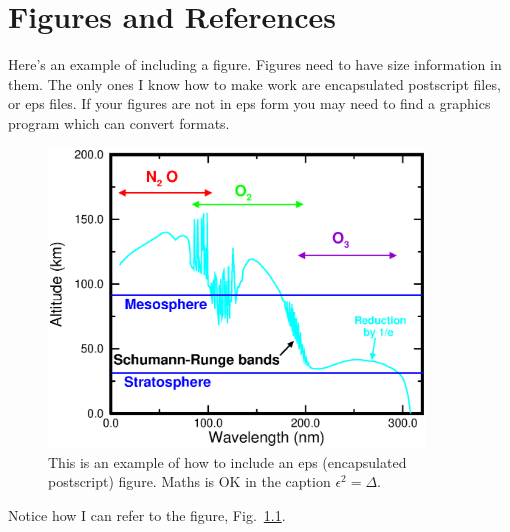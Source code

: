 \setcounter{page}{1}  %

\chapter{Figures and References}



Here's an example of including a figure. Figures need to have size information in them. The only ones I know how to make work are encapsulated postscript files, or eps files. If your figures are not in eps form you may need to find a graphics program which can convert formats.
\begin{figure}
  \begin{center}  %
    \includegraphics[width=10cm]{fig1.eps}
  \end{center}
\caption{This is an example of how to include an eps (encapsulated postscript) figure. Maths is OK in the caption $\epsilon^2 =\Delta$. }
\label{some text as a figure label}
\end{figure}
%
Notice how I can refer to the figure, Fig.~\ref{some text as a figure label}. 
